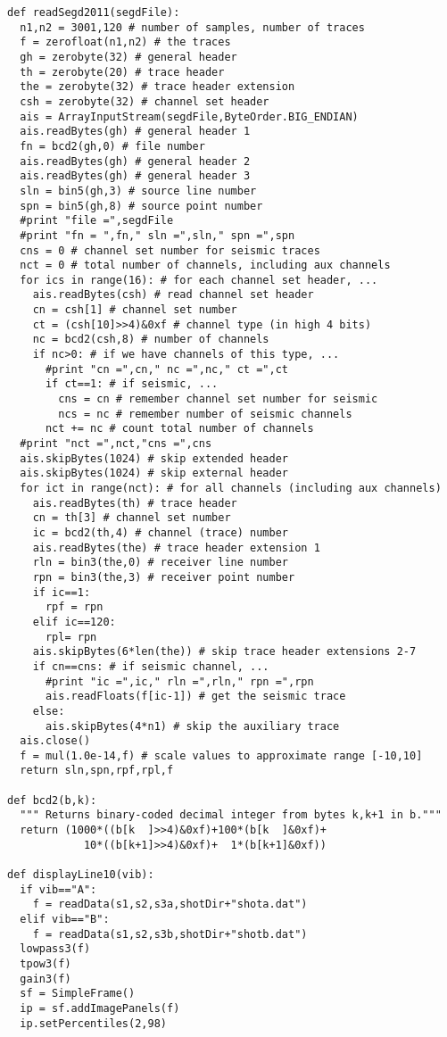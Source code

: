 \documentclass[11pt]{article}
\begin{document}
\begin{enumerate}
\begin{lstlisting}
def readSegd2011(segdFile):
  n1,n2 = 3001,120 # number of samples, number of traces
  f = zerofloat(n1,n2) # the traces
  gh = zerobyte(32) # general header
  th = zerobyte(20) # trace header
  the = zerobyte(32) # trace header extension
  csh = zerobyte(32) # channel set header
  ais = ArrayInputStream(segdFile,ByteOrder.BIG_ENDIAN)
  ais.readBytes(gh) # general header 1
  fn = bcd2(gh,0) # file number
  ais.readBytes(gh) # general header 2
  ais.readBytes(gh) # general header 3
  sln = bin5(gh,3) # source line number
  spn = bin5(gh,8) # source point number
  #print "file =",segdFile
  #print "fn = ",fn," sln =",sln," spn =",spn
  cns = 0 # channel set number for seismic traces
  nct = 0 # total number of channels, including aux channels
  for ics in range(16): # for each channel set header, ...
    ais.readBytes(csh) # read channel set header
    cn = csh[1] # channel set number
    ct = (csh[10]>>4)&0xf # channel type (in high 4 bits)
    nc = bcd2(csh,8) # number of channels
    if nc>0: # if we have channels of this type, ...
      #print "cn =",cn," nc =",nc," ct =",ct
      if ct==1: # if seismic, ...
        cns = cn # remember channel set number for seismic
        ncs = nc # remember number of seismic channels
      nct += nc # count total number of channels
  #print "nct =",nct,"cns =",cns
  ais.skipBytes(1024) # skip extended header
  ais.skipBytes(1024) # skip external header
  for ict in range(nct): # for all channels (including aux channels)
    ais.readBytes(th) # trace header
    cn = th[3] # channel set number
    ic = bcd2(th,4) # channel (trace) number
    ais.readBytes(the) # trace header extension 1
    rln = bin3(the,0) # receiver line number
    rpn = bin3(the,3) # receiver point number
    if ic==1:
      rpf = rpn
    elif ic==120:
      rpl= rpn
    ais.skipBytes(6*len(the)) # skip trace header extensions 2-7
    if cn==cns: # if seismic channel, ...
      #print "ic =",ic," rln =",rln," rpn =",rpn
      ais.readFloats(f[ic-1]) # get the seismic trace
    else:
      ais.skipBytes(4*n1) # skip the auxiliary trace
  ais.close()
  f = mul(1.0e-14,f) # scale values to approximate range [-10,10]
  return sln,spn,rpf,rpl,f

def bcd2(b,k):
  """ Returns binary-coded decimal integer from bytes k,k+1 in b."""
  return (1000*((b[k  ]>>4)&0xf)+100*(b[k  ]&0xf)+
            10*((b[k+1]>>4)&0xf)+  1*(b[k+1]&0xf))

def displayLine10(vib):
  if vib=="A":
    f = readData(s1,s2,s3a,shotDir+"shota.dat")
  elif vib=="B":
    f = readData(s1,s2,s3b,shotDir+"shotb.dat")
  lowpass3(f)
  tpow3(f)
  gain3(f)
  sf = SimpleFrame()
  ip = sf.addImagePanels(f)
  ip.setPercentiles(2,98)


\end{lstlisting}
\end{enumerate}
\end{document}
